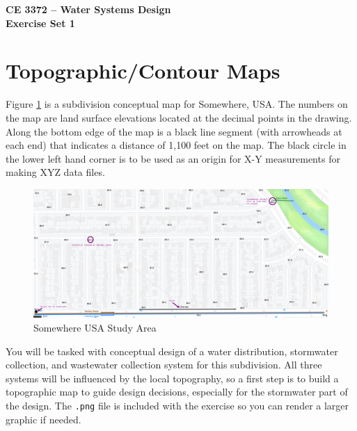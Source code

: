 \documentclass[12pt]{article}
\begin{document}
\begin{center}
{\textbf{{ CE 3372 -- Water Systems Design} \\ {Exercise Set 1}}}
\end{center}

\section*{\small{Topographic/Contour Maps}}

Figure \ref{fig:somewhereUSABaseMap} is a subdivision conceptual map for Somewhere, USA.
The numbers on the map are land surface elevations located at the decimal points in the drawing.
Along the bottom edge of the map is a black line segment (with arrowheads at each end) that indicates a distance of 1,100 feet on the map. The black circle in the lower left hand corner is to be used as an origin for X-Y measurements for making XYZ data files.

\begin{figure}[h!] %
   \centering
   \includegraphics[width=6.5in]{SomewhereUSABaseMap.png} 
   \caption{Somewhere USA Study Area}
   \label{fig:somewhereUSABaseMap}
\end{figure}

You will be tasked with conceptual design of a water distribution, stormwater collection, and wastewater collection system for this subdivision.
All three systems will be influenced by the local topography, so a first step is to build a topographic map to guide design decisions, especially for the stormwater part of the design.  The \texttt{.png} file is included with the exercise so you can render a larger graphic if needed.
\end{document}

